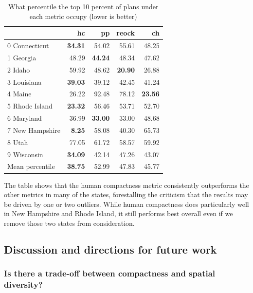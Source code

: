 \documentclass[]{article}
\begin{document}
\begin{table}[h!]
\begin{center}
\caption{What percentile the top 10 percent of plans under each metric occupy (lower is better)}
\label{table:top_plans_sd_percentile}
\begin{tabular}{lrrrr}
\toprule
{} &     hc &     pp &  reock &     ch \\
\midrule
0 Connecticut &  \textbf{34.31} &  54.02 &  55.61 &  48.25 \\
1 Georgia &  48.29 &  \textbf{44.24} &  48.34 &  47.62 \\
2 Idaho &  59.92 &  48.62 &  \textbf{20.90} &  26.88 \\
3 Louisiana &  \textbf{39.03} &  39.12 &  42.45 &  41.24 \\
4 Maine &  26.22 &  92.48 &  78.12 &  \textbf{23.56} \\
5 Rhode Island &  \textbf{23.32} &  56.46 &  53.71 &  52.70 \\
6 Maryland &  36.99 &  \textbf{33.00} &  33.00 &  48.68 \\
7 New Hampshire &   \textbf{8.25} &  58.08 &  40.30 &  65.73 \\
8 Utah &  77.05 &  61.72 &  58.57 &  59.92 \\
9 Wisconsin &  \textbf{34.09} &  42.14 &  47.26 &  43.07 \\
\bottomrule
Mean percentile & \textbf{38.75} &  52.99  &  47.83 &  45.77 \\
\bottomrule
\end{tabular}
\end{center}
\end{table}

The table shows that the human compactness metric consistently
outperforms the other metrics in many of the states, forestalling the
criticism that the results may be driven by one or two outliers. While
human compactness does particularly well in New Hampshire and Rhode
Island, it still performs best overall even if we remove those two
states from consideration.

\hypertarget{discussion-and-directions-for-future-work}{%
\subsection{Discussion and directions for future
work}\label{discussion-and-directions-for-future-work}}

\hypertarget{is-there-a-trade-off-between-compactness-and-spatial-diversity}{%
\subsubsection{Is there a trade-off between compactness and spatial
diversity?}\label{is-there-a-trade-off-between-compactness-and-spatial-diversity}}
\end{document}
